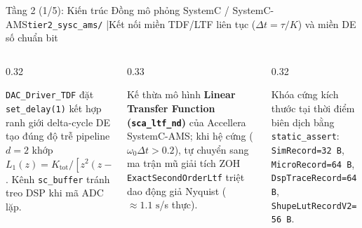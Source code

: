 \documentclass[aspectratio=169,8pt]{beamer}
\begin{document}
\begin{frame}{Tầng 2 (1/5): Kiến trúc Đồng mô phỏng SystemC / SystemC-AMS}{\texttt{tier2\_sysc\_ams/} \enspace|\enspace Kết nối miền TDF/LTF liên tục ($\Delta t = \tau/K$) và miền DE số chuẩn bit}
\begin{center}
\end{center}

\vspace{0.10cm}
\begin{columns}[T]
  \begin{column}{0.32\textwidth}
    \begin{remarkbox}[1. Phá vòng Đại số ($d=2$)]
      \texttt{DAC\_Driver\_TDF} đặt \texttt{set\_delay(1)} kết hợp ranh giới delta-cycle DE tạo đúng độ trễ pipeline $d=2$ khớp $L_1(z)=K_{\text{tot}}/[z^2(z-1)]$. Kênh \texttt{sc\_buffer} tránh treo DSP khi mã ADC lặp.
    \end{remarkbox}
  \end{column}
  \begin{column}{0.33\textwidth}
    \begin{eqbox}
      Kế thừa mô hình \textbf{Linear Transfer Function (\texttt{sca\_ltf\_nd})} của Accellera SystemC-AMS; khi hệ cứng ($\omega_0\Delta t > 0.2$), tự chuyển sang ma trận mũ giải tích ZOH \texttt{ExactSecondOrderLtf} triệt dao động giả Nyquist ($\approx 1.1\text{ s}$/s thực).
    \end{eqbox}
  \end{column}
  \begin{column}{0.32\textwidth}
    \begin{notebox}
      Khóa cứng kích thước tại thời điểm biên dịch bằng \texttt{static\_assert}: \texttt{SimRecord=32 B}, \texttt{MicroRecord=64 B}, \texttt{DspTraceRecord=64 B}, \texttt{ShupeLutRecordV2=56 B}.
    \end{notebox}
  \end{column}
\end{columns}
\end{frame}
\end{document}
